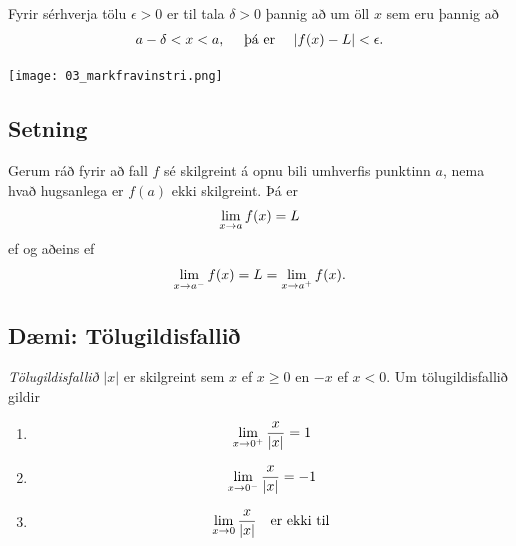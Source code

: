 \documentclass[a4paper,10pt,icelandic]{sphinxmanual}
\begin{document}
Fyrir sérhverja tölu \(\epsilon>0\) er til tala \(\delta>0\)
þannig að um öll \(x\) sem eru þannig að
\begin{gather}
\begin{split}a-\delta<x<a,\quad \text{ þá er } \quad |f(x)-L| <\epsilon.\end{split}\notag
\end{gather}

\begin{center}
\texttt{[image: 03\_markfravinstri.png]}
\end{center}



\subsection{Setning}
\label{kafli02:setning}\label{kafli02:setning-hv-markgildi}
Gerum ráð fyrir að fall \(f\) sé skilgreint á opnu bili umhverfis
punktinn \(a\), nema hvað hugsanlega er \(f(a)\) ekki
skilgreint. Þá er
\begin{gather}
\begin{split}\lim_{x\rightarrow a} f(x)=L\end{split}\notag
\end{gather}
ef og aðeins ef
\begin{gather}
\begin{split}\lim_{x\rightarrow a^-} f(x)=L=\lim_{x\rightarrow a^+} f(x).\end{split}\notag
\end{gather}

\subsection{Dæmi: Tölugildisfallið}
\label{kafli02:daemi-tolugildisfalli}
\textit{Tölugildisfallið} \(|x|\) er skilgreint sem \(x\)
ef \(x\geq 0\) en \(-x\) ef \(x<0\). Um tölugildisfallið gildir
\begin{enumerate}
\item {} \begin{gather}
\begin{split}\lim_{x\to 0^+} \frac x{|x|} = 1\end{split}\notag
\end{gather}
\item {} \begin{gather}
\begin{split}\lim_{x\to 0^-} \frac x{|x|} = -1\end{split}\notag
\end{gather}
\item {} \begin{gather}
\begin{split}\lim_{x\to 0} \frac x{|x|} \quad \text{er ekki til}\end{split}\notag
\end{gather}
\end{enumerate}
\end{document}
